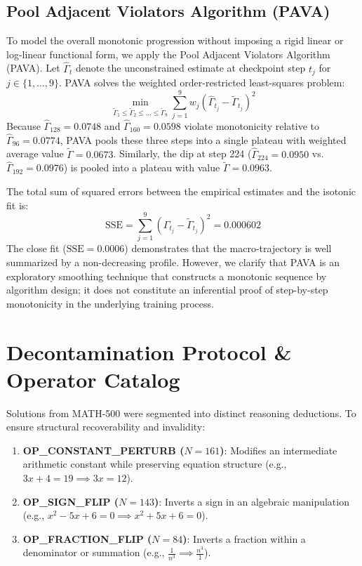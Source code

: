 \documentclass{article}
\begin{document}
\subsection{Pool Adjacent Violators Algorithm (PAVA)}
To model the overall monotonic progression without imposing a rigid linear or log-linear functional form, we apply the Pool Adjacent Violators Algorithm (PAVA). Let $\hat{\Gamma}_t$ denote the unconstrained estimate at checkpoint step $t_j$ for $j \in \{1, \dots, 9\}$. PAVA solves the weighted order-restricted least-squares problem:
\begin{equation}
\min_{\tilde{\Gamma}_1 \le \tilde{\Gamma}_2 \le \dots \le \tilde{\Gamma}_9} \sum_{j=1}^9 w_j (\hat{\Gamma}_{t_j} - \tilde{\Gamma}_{t_j})^2
\end{equation}
Because $\hat{\Gamma}_{128} = 0.0748$ and $\hat{\Gamma}_{160} = 0.0598$ violate monotonicity relative to $\hat{\Gamma}_{96} = 0.0774$, PAVA pools these three steps into a single plateau with weighted average value $\tilde{\Gamma} = 0.0673$. Similarly, the dip at step 224 ($\hat{\Gamma}_{224} = 0.0950$ vs. $\hat{\Gamma}_{192} = 0.0976$) is pooled into a plateau with value $\tilde{\Gamma} = 0.0963$.

The total sum of squared errors between the empirical estimates and the isotonic fit is:
\begin{equation}
\text{SSE} = \sum_{j=1}^9 (\hat{\Gamma}_{t_j} - \tilde{\Gamma}_{t_j})^2 = 0.000602
\end{equation}
The close fit ($\text{SSE} = 0.0006$) demonstrates that the macro-trajectory is well summarized by a non-decreasing profile. However, we clarify that PAVA is an exploratory smoothing technique that constructs a monotonic sequence by algorithm design; it does not constitute an inferential proof of step-by-step monotonicity in the underlying training process.

\section{Decontamination Protocol \& Operator Catalog}
Solutions from MATH-500 were segmented into distinct reasoning deductions. To ensure structural recoverability and invalidity:
\begin{enumerate}
    \item \textbf{OP\_CONSTANT\_PERTURB ($N=161$)}: Modifies an intermediate arithmetic constant while preserving equation structure (e.g., $3x + 4 = 19 \implies 3x = 12$).
    \item \textbf{OP\_SIGN\_FLIP ($N=143$)}: Inverts a sign in an algebraic manipulation (e.g., $x^2 - 5x + 6 = 0 \implies x^2 + 5x + 6 = 0$).
    \item \textbf{OP\_FRACTION\_FLIP ($N=84$)}: Inverts a fraction within a denominator or summation (e.g., $\frac{1}{n^3} \implies \frac{n^3}{1}$).
\end{enumerate}
\end{document}
